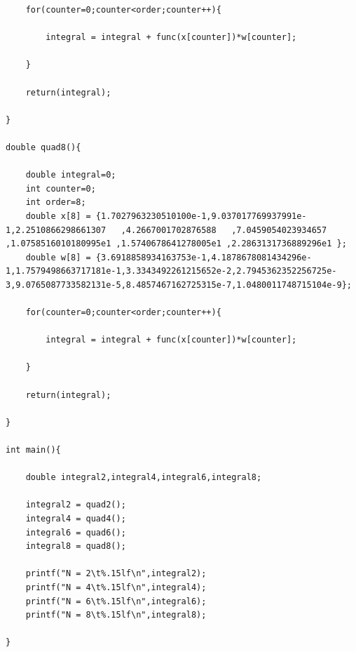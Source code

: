\documentclass[12pt]{article}
\begin{document}
\begin{verbatim}
	for(counter=0;counter<order;counter++){

		integral = integral + func(x[counter])*w[counter];

	}

	return(integral);

}

double quad8(){

	double integral=0;
	int counter=0;
	int order=8;
	double x[8] = {1.7027963230510100e-1,9.037017769937991e-1,2.2510866298661307   ,4.2667001702876588   ,7.0459054023934657   ,1.0758516010180995e1 ,1.5740678641278005e1 ,2.2863131736889296e1 };
	double w[8] = {3.6918858934163753e-1,4.1878678081434296e-1,1.7579498663717181e-1,3.3343492261215652e-2,2.7945362352256725e-3,9.0765087733582131e-5,8.4857467162725315e-7,1.0480011748715104e-9};

	for(counter=0;counter<order;counter++){

		integral = integral + func(x[counter])*w[counter];

	}

	return(integral);

}

int main(){

	double integral2,integral4,integral6,integral8;

	integral2 = quad2();
	integral4 = quad4();
	integral6 = quad6();
	integral8 = quad8();

	printf("N = 2\t%.15lf\n",integral2);
	printf("N = 4\t%.15lf\n",integral4);
	printf("N = 6\t%.15lf\n",integral6);
	printf("N = 8\t%.15lf\n",integral8);

}
\end{verbatim}
\end{document}

